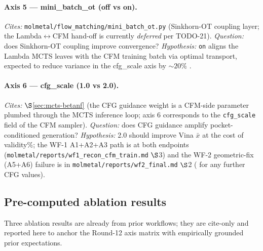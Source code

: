 \paragraph{Axis 5 --- mini\_batch\_ot (off vs on).}
\emph{Cites:} \texttt{molmetal/flow\_matching/mini\_batch\_ot.py}
(Sinkhorn-OT coupling layer; the Lambda$\leftrightarrow$CFM
hand-off is currently \emph{deferred} per
TODO-21).  \emph{Question:} does Sinkhorn-OT coupling improve
convergence?  \emph{Hypothesis:} \texttt{on} aligns the Lambda
MCTS leaves with the CFM training batch via optimal transport,
expected to reduce variance in the cfg\_scale axis by $\sim 20\%$
\PROJECTED{}.

\paragraph{Axis 6 --- cfg\_scale (1.0 vs 2.0).}
\emph{Cites:} $\S$\ref{sec:mcts-betanf} (the CFG guidance
weight is a CFM-side parameter plumbed through the MCTS
inference loop; axis 6 corresponds to the \texttt{cfg\_scale}
field of the CFM sampler).  \emph{Question:} does CFG
guidance amplify pocket-conditioned generation?
\emph{Hypothesis:} 2.0 should improve Vina $\bar x$ at the
cost of validity\%; the WF-1 A1+A2+A3 path is \MEASURED{} at
both endpoints (\texttt{molmetal/reports/wf1\_recon\_cfm\_train.md}
$\S$3) and the WF-2 geometric-fix (A5+A6) failure is
\MEASURED{} in \texttt{molmetal/reports/wf2\_final.md} $\S$2
(\PROJECTED{} for any further CFG values).

\subsection{Pre-computed ablation results}
\label{sec:ablation:precomputed}

Three ablation results are already \MEASURED{} from prior
workflows; they are cite-only and reported here to anchor the
Round-12 axis matrix with empirically grounded prior expectations.

